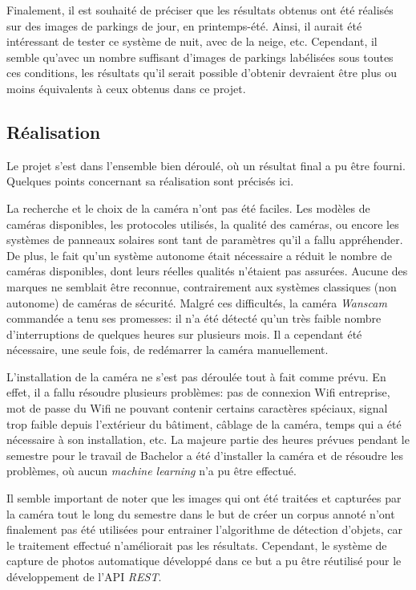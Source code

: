 Finalement, il est souhaité de préciser que les résultats obtenus ont été réalisés sur des images de parkings de jour, en printemps-été. Ainsi, il aurait été intéressant de tester ce système de nuit, avec de la neige, etc. Cependant, il semble qu'avec un nombre suffisant d'images de parkings labélisées sous toutes ces conditions, les résultats qu'il serait possible d'obtenir devraient être plus ou moins équivalents à ceux obtenus dans ce projet. 

\subsection{Réalisation}

Le projet s'est dans l'ensemble bien déroulé, où un résultat final a pu être fourni. Quelques points concernant sa réalisation sont précisés ici.

La recherche et le choix de la caméra n'ont pas été faciles. Les modèles de caméras disponibles, les protocoles utilisés, la qualité des caméras, ou encore les systèmes de panneaux solaires sont tant de paramètres qu'il a fallu appréhender. De plus, le fait qu'un système autonome était nécessaire a réduit le nombre de caméras disponibles, dont leurs réelles qualités n'étaient pas assurées. Aucune des marques ne semblait être reconnue, contrairement aux systèmes classiques (non autonome) de caméras de sécurité. Malgré ces difficultés, la caméra \textit{Wanscam} commandée a tenu ses promesses: il n'a été détecté qu'un très faible nombre d'interruptions de quelques heures sur plusieurs mois. Il a cependant été nécessaire, une seule fois, de redémarrer la caméra manuellement.

L'installation de la caméra ne s'est pas déroulée tout à fait comme prévu. En effet, il a fallu résoudre plusieurs problèmes: pas de connexion Wifi entreprise, mot de passe du Wifi ne pouvant contenir certains caractères spéciaux, signal trop faible depuis l'extérieur du bâtiment, câblage de la caméra, temps qui a été nécessaire à son installation, etc. La majeure partie des heures prévues pendant le semestre pour le travail de Bachelor a été d'installer la caméra et de résoudre les problèmes, où aucun \textit{machine learning} n'a pu être effectué.

Il semble important de noter que les images qui ont été traitées et capturées par la caméra tout le long du semestre dans le but de créer un corpus annoté n'ont finalement pas été utilisées pour entrainer l'algorithme de détection d'objets, car le traitement effectué n'améliorait pas les résultats. Cependant, le système de capture de photos automatique développé dans ce but a pu être réutilisé pour le développement de l'API \textit{REST}.

